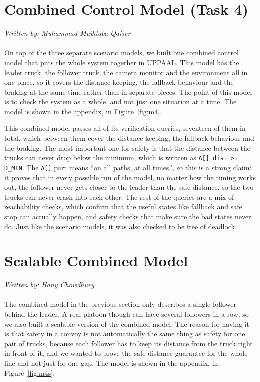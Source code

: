 \documentclass[english]{lni}
\begin{document}
\section{Combined Control Model (Task 4)}
\textit{Written by: Muhammad Mujhtaba Qaiser}
\\~\\
On top of the three separate scenario models, we built one combined control model that puts the whole system together in UPPAAL. This model has the leader truck, the follower truck, the camera monitor and the environment all in one place, so it covers the distance keeping, the fallback behaviour and the braking at the same time rather than in separate pieces. The point of this model is to check the system as a whole, and not just one situation at a time. The model is shown in the appendix, in Figure~\ref{fig:m4}.

This combined model passes all of its verification queries, seventeen of them in total, which between them cover the distance keeping, the fallback behaviour and the braking. The most important one for safety is that the distance between the trucks can never drop below the minimum, which is written as \texttt{A[] dist >= D\_MIN}. The \texttt{A[]} part means ``on all paths, at all times'', so this is a strong claim: it proves that in every possible run of the model, no matter how the timing works out, the follower never gets closer to the leader than the safe distance, so the two trucks can never crash into each other. The rest of the queries are a mix of reachability checks, which confirm that the useful states like fallback and safe stop can actually happen, and safety checks that make sure the bad states never do. Just like the scenario models, it was also checked to be free of deadlock.

\section{Scalable Combined Model}
\textit{Written by: Hany Chowdhury}
\\~\\
The combined model in the previous section only describes a single follower behind the leader. A real platoon though can have several followers in a row, so we also built a scalable version of the combined model. The reason for having it is that safety in a convoy is not automatically the same thing as safety for one pair of trucks, because each follower has to keep its distance from the truck right in front of it, and we wanted to prove the safe-distance guarantee for the whole line and not just for one gap. The model is shown in the appendix, in Figure~\ref{fig:m4s}.
\end{document}
